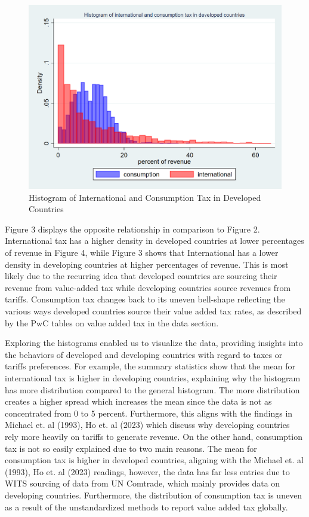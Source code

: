 \documentclass[12pt]{article}
\begin{document}
\begin{figure}[H]
    \centering
    \includegraphics[width=0.8\linewidth]{Reproducibility_Package//research_outputs/twowayhistdevelopedintcons.png}
    \caption{Histogram of International and Consumption Tax in Developed Countries}
    \label{fig:enter-label}
\end{figure}

Figure 3 displays the opposite relationship in comparison to Figure 2. International tax has a higher density in developed countries at lower percentages of revenue in Figure 4, while Figure 3 shows that International has a lower density in developing countries at higher percentages of revenue. This is most likely due to the recurring idea that developed countries are sourcing their revenue from value-added tax while developing countries source revenues from tariffs. Consumption tax changes back to its uneven bell-shape reflecting the various ways developed countries source their value added tax rates, as described by the PwC tables on value added tax in the data section. 

Exploring the histograms enabled us to visualize the data, providing insights into the behaviors of developed and developing countries with regard to taxes or tariffs preferences. 
For example, the summary statistics show that the mean for international tax is higher in developing countries, explaining why the histogram has more distribution compared to the general histogram. The more distribution creates a higher spread which increases the mean since the data is not as concentrated from 0 to 5 percent. Furthermore, this aligns with the findings in Michael et. al (1993), Ho et. al (2023) which discuss why developing countries rely more heavily on tariffs to generate revenue. On the other hand, consumption tax is not so easily explained due to two main reasons. The mean for consumption tax is higher in developed countries, aligning with the Michael et. al (1993), Ho et. al (2023) readings, however, the data has far less entries due to WITS sourcing of data from UN Comtrade, which mainly provides data on developing countries. Furthermore, the distribution of consumption tax is uneven as a result of the unstandardized methods to report value added tax globally. 
\end{document}
